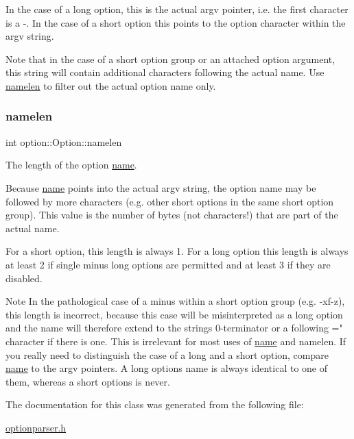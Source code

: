 In the case of a long option, this is the actual {\ttfamily argv} pointer, i.\+e. the first character is a \textquotesingle{}-\/\textquotesingle{}. In the case of a short option this points to the option character within the {\ttfamily argv} string.

Note that in the case of a short option group or an attached option argument, this string will contain additional characters following the actual name. Use \hyperlink{classoption_1_1Option_a3aa2957b19ad5815873441b415d56050}{namelen} to filter out the actual option name only. \mbox{\label{classoption_1_1Option_a3aa2957b19ad5815873441b415d56050}} 
\subsubsection{\texorpdfstring{namelen}{namelen}}
{\footnotesize\ttfamily int option\+::\+Option\+::namelen}



The length of the option \hyperlink{classoption_1_1Option_a02a76b4896abd22d0ba8514362261de9}{name}. 

Because \hyperlink{classoption_1_1Option_a02a76b4896abd22d0ba8514362261de9}{name} points into the actual {\ttfamily argv} string, the option name may be followed by more characters (e.\+g. other short options in the same short option group). This value is the number of bytes (not characters!) that are part of the actual name.

For a short option, this length is always 1. For a long option this length is always at least 2 if single minus long options are permitted and at least 3 if they are disabled.

\begin{DoxyNote}{Note}
In the pathological case of a minus within a short option group (e.\+g. {\ttfamily -\/xf-\/z}), this length is incorrect, because this case will be misinterpreted as a long option and the name will therefore extend to the string\textquotesingle{}s 0-\/terminator or a following \textquotesingle{}=" character if there is one. This is irrelevant for most uses of \hyperlink{classoption_1_1Option_a02a76b4896abd22d0ba8514362261de9}{name} and {\ttfamily namelen}. If you really need to distinguish the case of a long and a short option, compare \hyperlink{classoption_1_1Option_a02a76b4896abd22d0ba8514362261de9}{name} to the {\ttfamily argv} pointers. A long option\textquotesingle{}s {\ttfamily name} is always identical to one of them, whereas a short option\textquotesingle{}s is never. 
\end{DoxyNote}


The documentation for this class was generated from the following file\+:\begin{DoxyCompactItemize}
\item 
\hyperlink{optionparser_8h}{optionparser.\+h}\end{DoxyCompactItemize}
